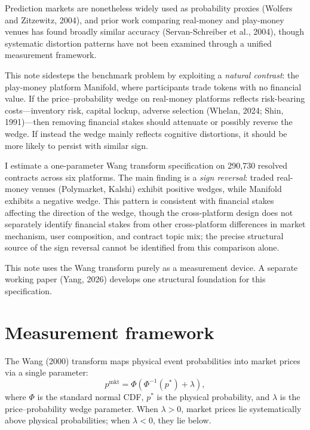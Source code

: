 \documentclass[12pt]{article}
\begin{document}
Prediction markets are nonetheless widely used as probability proxies (Wolfers and Zitzewitz, 2004), and prior work comparing real-money and play-money venues has found broadly similar accuracy (Servan-Schreiber et al., 2004), though systematic distortion patterns have not been examined through a unified measurement framework.

This note sidesteps the benchmark problem by exploiting a \emph{natural contrast}: the play-money platform Manifold, where participants trade tokens with no financial value. If the price--probability wedge on real-money platforms reflects risk-bearing costs---inventory risk, capital lockup, adverse selection (Whelan, 2024; Shin, 1991)---then removing financial stakes should attenuate or possibly reverse the wedge. If instead the wedge mainly reflects cognitive distortions, it should be more likely to persist with similar sign.

I estimate a one-parameter Wang transform specification on 290,730 resolved contracts across six platforms. The main finding is a \emph{sign reversal}: traded real-money venues (Polymarket, Kalshi) exhibit positive wedges, while Manifold exhibits a negative wedge. This pattern is consistent with financial stakes affecting the direction of the wedge, though the cross-platform design does not separately identify financial stakes from other cross-platform differences in market mechanism, user composition, and contract topic mix; the precise structural source of the sign reversal cannot be identified from this comparison alone.

This note uses the Wang transform purely as a measurement device. A separate working paper (Yang, 2026) develops one structural foundation for this specification.

\section{Measurement framework}

The Wang (2000) transform maps physical event probabilities into market prices via a single parameter:
\begin{equation}\label{eq:wang}
p^{\mathrm{mkt}} = \Phi\!\left(\Phi^{-1}(p^*) + \lambda\right),
\end{equation}
where $\Phi$ is the standard normal CDF, $p^*$ is the physical probability, and $\lambda$ is the price--probability wedge parameter. When $\lambda > 0$, market prices lie systematically above physical probabilities; when $\lambda < 0$, they lie below.
\end{document}
